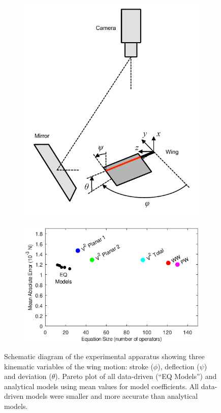 \documentclass[fleqn,10pt]{wlscirep}
\begin{document}
\begin{figure}%
\centering
\begin{subfigure}{0.3\textwidth}
\includegraphics[trim=0 15 0 5, clip, width=\textwidth]{figures/apparatus}
\caption{\label{fig:apparatus}}
\end{subfigure}
\qquad
\begin{subfigure}{0.5\textwidth}
\centering
\includegraphics[width=\textwidth]{figures/mae_nofit}
\caption{\label{fig:pareto_mae}}
\end{subfigure}
\caption{ Schematic diagram of the experimental apparatus showing three
  kinematic variables of the wing motion: stroke ($\phi$), deflection ($\psi$) and deviation
  ($\theta$).  Pareto plot of all data-driven (``EQ Models'') and analytical
  models using mean values for model coefficients. All data-driven models were smaller and more
  accurate than analytical models.
}
\end{figure}
\end{document}
